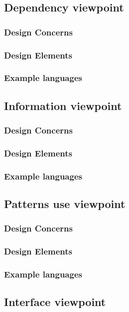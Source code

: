 \documentclass[onecolumn, draftclsnofoot,10pt, compsoc]{IEEEtran}
\begin{document}
\begin{singlespace}
	\subsection{Dependency viewpoint}
		\subsubsection{Design Concerns}
		\subsubsection{Design Elements}
		\subsubsection{Example languages}
	\subsection{Information viewpoint}
		\subsubsection{Design Concerns}
		\subsubsection{Design Elements}
		\subsubsection{Example languages}
	\subsection{Patterns use viewpoint}
		\subsubsection{Design Concerns}
		\subsubsection{Design Elements}
		\subsubsection{Example languages}
	\subsection{Interface viewpoint}

\end{singlespace}
\end{document}
